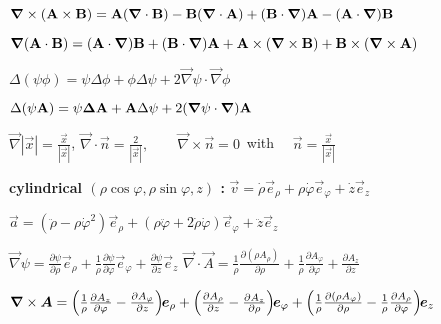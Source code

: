 \item $\vec \nabla \times (\vec{\rm{A}} \times \vec{\rm{B}}) = \vec{\rm{A}} (\vec \nabla \cdot \vec{\rm{B}}) - \vec{\rm{B}} (\vec \nabla \cdot \vec{\rm{A}}) + (\vec{\rm{B}} \cdot \vec \nabla)\vec{\rm{A}} - (\vec{\rm{A}} \cdot \vec \nabla)\vec{\rm{B}}$ 

\item $\vec \nabla (\vec{\rm{A}} \cdot \vec{\rm{B}}) = (\vec{\rm{A}} \cdot \vec \nabla)\vec{\rm{B}} + (\vec{\rm{B}} \cdot \vec \nabla)\vec{\rm{A}} + \vec{\rm{A}} \times (\vec \nabla \times \vec{\rm{B}}) + \vec{\rm{B}} \times (\vec \nabla \times \vec{\rm{A}})$

\item $\Delta(\psi\phi) = \psi\Delta\phi + \phi\Delta\psi + 2\vec{\nabla} \psi \cdot \vec{\nabla} \phi$

\item $\Delta(\psi\vec{\rm{A}}) = \psi \vec{\Delta} \vec{\rm{A}} + \vec{\rm{A}}\Delta\psi + 2(\vec{\nabla}\psi \cdot \vec{\nabla})\vec{\rm{A}}$

\item $\vec{\nabla}|\vec{x}| = \frac{\vec{x}}{|\vec{x}|}$, $\vec{\nabla}\cdot\vec{n} = \frac{2}{|\vec{x}|}, \qquad \vec{\nabla} \times \vec{n} = 0 \,$ with $\quad \vec{n} = \frac{\vec{x}}{|\vec{x}|}$


\item[] \textbf{cylindrical $(\rho\cos\varphi, \rho\sin\varphi, z)$ : \:}
$\vec{v} = \dot{\rho}\vec{e}_\rho + \rho\dot{\varphi}\vec{e}_\varphi + \dot{z}\vec{e}_z$

\item $\vec{a} = (\ddot{\rho} - \rho\dot{\varphi}^2)\vec{e}_\rho + (\rho\ddot{\varphi} + 2\dot{\rho}\dot{\varphi})\vec{e}_\varphi + \ddot{z}\vec{e}_z$
 
\item $\vec{\nabla}\psi=\frac{\partial \psi}{\partial \rho}\vec{e}_\rho+\frac{1}{\rho}\frac{\partial \psi}{\partial \varphi}\vec{e}_{\varphi}+\frac{\partial \psi}{\partial z}\vec{e}_z$ \squishsep $\vec{\nabla} \cdot \vec{A}=\frac{1}{\rho}\frac{\partial(\rho A_\rho)}{\partial \rho} + \frac{1}{\rho}\frac{\partial A_{\varphi}}{\partial \varphi}+\frac{\partial A_z}{\partial z}$

\item $\vec{\nabla} \times \vec{A}=\left(\frac{1}{\rho}\frac{\partial A_z}{\partial\varphi}-\frac{\partial A_{\varphi}}{\partial z}\right)\hspace{-0.1cm}\vec{e}_\rho+\left(\frac{\partial A_\rho}{\partial z}-\frac{\partial A_z}{\partial \rho}\right)\hspace{-0.1cm}\vec{e}_{\varphi}+\left(\frac{1}{\rho}\frac{\partial(\rho A_{\varphi})}{\partial \rho}-\frac{1}{\rho}\frac{\partial A_\rho}{\partial\varphi}\right)\hspace{-0.1cm}\vec{e}_z$

